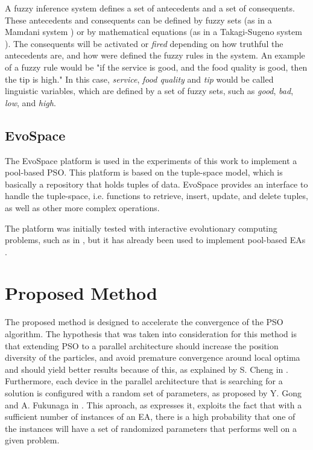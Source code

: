 A fuzzy inference system defines a set of antecedents and a set of consequents. These antecedents and consequents can be defined by fuzzy sets (as in a Mamdani system \cite{mamdani1975experiment}) or by mathematical equations (as in a Takagi-Sugeno system \cite{takagi1985fuzzy}). The consequents will be activated or \textit{fired} depending on how truthful the antecedents are, and how were defined the fuzzy rules in the system. An example of a fuzzy rule would be "if the service is good, and the food quality is good, then the tip is high." In this case, \textit{service}, \textit{food quality} and \textit{tip} would be called linguistic variables, which are defined by a set of fuzzy sets, such as \textit{good}, \textit{bad}, \textit{low}, and \textit{high}.

\subsection{EvoSpace}
\label{evospace}

The EvoSpace platform \cite{garcia2013evospace} is used in the experiments of this work to implement a pool-based PSO. This platform is based on the tuple-space model, which is basically a repository that holds tuples of data. EvoSpace provides an interface to handle the tuple-space, i.e. functions to retrieve, insert, update, and delete tuples, as well as other more complex operations.

The platform was initially tested with interactive evolutionary computing problems, such as in \cite{garcia2013interactive}, but it has already been used to implement pool-based EAs \cite{garcia2015evospace}.

\section{Proposed Method}
\label{proposed-method}

The proposed method is designed to accelerate the convergence of the
PSO algorithm. The hypothesis that was taken into consideration for this method is
that extending PSO to a parallel architecture should increase the
position diversity of the particles, and avoid premature convergence around local optima and should yield better results because of this, as explained
by S. Cheng in \cite{cheng2013population}. Furthermore, each device in
the parallel architecture that is searching for a solution is configured with a
random set of parameters, as proposed by Y. Gong and A. Fukunaga in \cite{gong2011distributed}. This aproach, as \cite{gong2011distributed} expresses it, exploits the fact that with a sufficient number of instances of an EA, there is a high probability that one of the instances will have a set of randomized parameters that performs well on a given problem.

